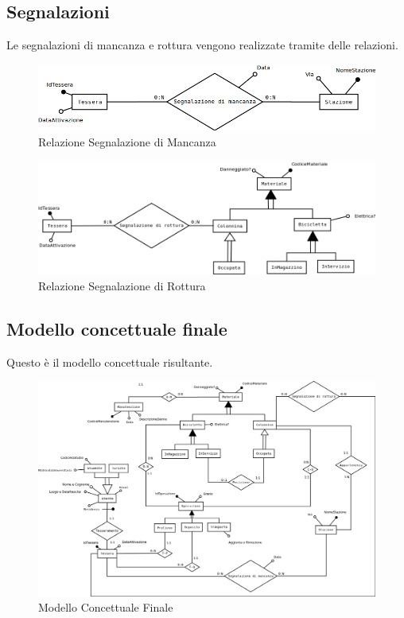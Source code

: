 \documentclass[a4paper,twoside]{article}
\begin{document}
\subsection{Segnalazioni}
Le segnalazioni di mancanza e rottura vengono realizzate tramite delle relazioni.
\begin{figure}[H]
 \centering
  \includegraphics[width=1\textwidth]{Concettuale14}
\caption{Relazione Segnalazione di Mancanza}
\end{figure}
\begin{figure}[H]
 \centering
  \includegraphics[width=1\textwidth]{Concettuale15}
\caption{Relazione Segnalazione di Rottura}
\end{figure}
\newpage
\subsection{Modello concettuale finale}
Questo è il modello concettuale risultante.
\begin{figure}[H]
 \centering
  \includegraphics[width=1.35\textwidth,angle=90]{ConcettualeFinale}
\caption{Modello Concettuale Finale}
\end{figure}
\newpage
\end{document}
